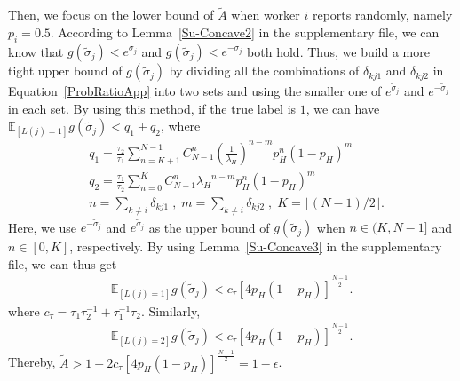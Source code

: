 \documentclass{article}
\begin{document}
Then, we focus on the lower bound of $\tilde{A}$ when worker $i$ reports randomly, namely $p_i=0.5$. According to Lemma~\ref{Su-Concave2} in the supplementary file, we can know that 
$g(\tilde{\sigma}_j)< e^{\tilde{\sigma}_j}$ and $g(\tilde{\sigma}_j)< e^{-\tilde{\sigma}_j}$ both hold.
Thus, we build a more tight upper bound of $g(\tilde{\sigma}_j)$ by dividing all the combinations of $\delta_{kj1}$ and $\delta_{kj2}$ in Equation~\ref{ProbRatioApp} into two sets and using the smaller one of $e^{\tilde{\sigma}_j}$ and $e^{-\tilde{\sigma}_j}$ in each set.
By using this method, if the true label is $1$, we can have $\mathbb{E}_{[L(j)=1]}g(\tilde{\sigma}_j)< q_1+q_2$, where
\begin{equation*}
\begin{split}
&q_1 = \frac{\tau_2}{\tau_1}{\sum}_{n=K+1}^{N-1}C_{N-1}^{n} (\frac{1}{\lambda_H})^{n-m}p_H^n(1-p_H)^m\\
&q_2 = \frac{\tau_1}{\tau_2}{\sum}_{n=0}^{K}C_{N-1}^{n} {\lambda_H}^{n-m}p_H^n(1-p_H)^m\\
&n={\sum}_{k\neq i}\delta_{kj1}\;,\;m= {\sum}_{k\neq i}\delta_{kj2}\;,\;K=\lfloor (N-1)/2 \rfloor.
\end{split}
\end{equation*}
Here, we use $e^{-\tilde{\sigma}_j}$ and $e^{\tilde{\sigma}_j}$ as the upper bound of $g(\tilde{\sigma}_j)$ when $n\in (K, N-1]$ and $n\in [0, K]$, respectively. By using Lemma~\ref{Su-Concave3} in the supplementary file, we can thus get
\begin{equation}
\begin{split}
\mathbb{E}_{[L(j)=1]}g(\tilde{\sigma}_j) < c_{\tau}[4p_H(1-p_H)]^{\frac{N-1}{2}}.
\end{split}
\end{equation}
where $c_{\tau}=\tau_1\tau_2^{-1}+\tau_1^{-1}\tau_2$. Similarly,
\begin{equation}
\begin{split}
\mathbb{E}_{[L(j)=2]}g(\tilde{\sigma}_j) < c_{\tau}[4p_H(1-p_H)]^{\frac{N-1}{2}}.
\end{split}
\end{equation}
Thereby, $\tilde{A}>1-2c_{\tau}[4p_H(1-p_H)]^{\frac{N-1}{2}}=1-\epsilon$.
\end{document}

